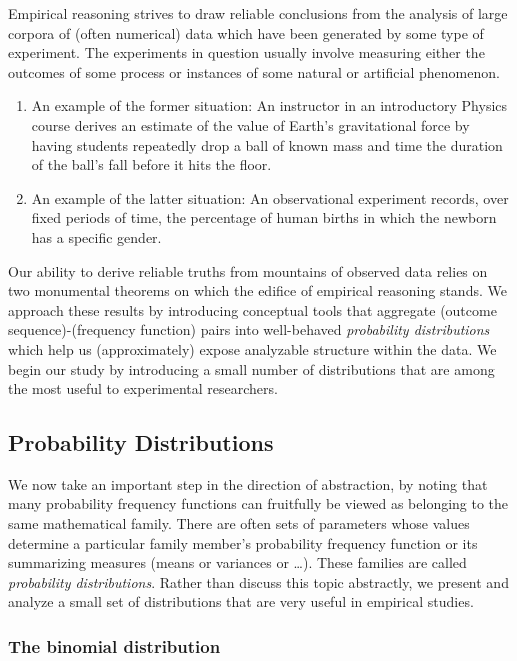 Empirical reasoning strives to draw reliable conclusions from the analysis of large corpora of (often numerical) data which have been generated by some type of experiment.  The experiments in question usually involve measuring either the outcomes of some process or instances of some natural or artificial phenomenon.
\begin{enumerate}
\item
An example of the former situation:  An instructor in an introductory Physics course derives an estimate of the value of Earth's gravitational force by having students repeatedly drop a ball of known mass and time the duration of the ball's fall before it hits the floor.

\medskip\item
An example of the latter situation:  An observational experiment records, over fixed periods of time, the percentage of human births in which the newborn has a specific gender.
\end{enumerate}

Our ability to derive reliable truths from mountains of observed data relies on two monumental theorems on which the edifice of empirical reasoning stands.  We approach these results by introducing conceptual tools that aggregate (outcome sequence)-(frequency function) pairs into well-behaved {\it probability distributions} which help us (approximately) expose analyzable structure within the data.  We begin our study by introducing a small number of distributions that are among the most useful to experimental researchers.

\subsection{Probability Distributions}
\label{sec:prob-distr}

We now take an important step in the direction of abstraction, by noting that many probability frequency functions can fruitfully be viewed as belonging to the same mathematical family.  There are often sets of parameters whose values determine a particular family member's probability frequency function or its summarizing measures (means or variances or \ldots). These families are called {\em probability distributions}.  Rather than discuss this topic abstractly, we present and analyze a small set of distributions that are very useful in empirical studies.

\subsubsection{The binomial distribution}
\label{sec:binomial-distribution}

